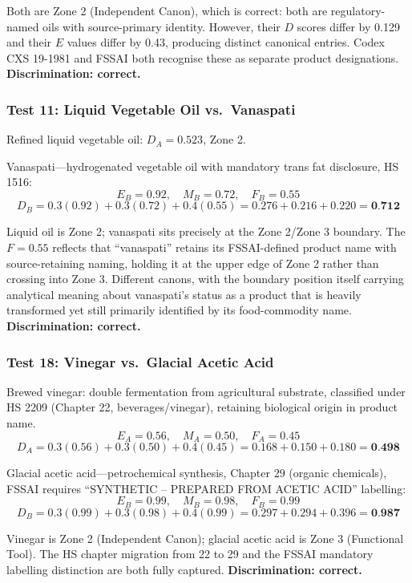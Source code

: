 \documentclass[12pt,a3paper]{article}
\begin{document}
Both are Zone 2 (Independent Canon), which is correct: both are regulatory-named oils with source-primary identity. However, their $D$ scores differ by 0.129 and their $E$ values differ by 0.43, producing distinct canonical entries. Codex CXS 19-1981 and FSSAI both recognise these as separate product designations. \textbf{Discrimination: correct.}

\subsubsection{Test 11: Liquid Vegetable Oil vs.\ Vanaspati}

Refined liquid vegetable oil: $D_A = 0.523$, Zone 2.

Vanaspati---hydrogenated vegetable oil with mandatory trans fat disclosure, HS 1516:
$$E_B = 0.92,\quad M_B = 0.72,\quad F_B = 0.55$$
$$D_B = 0.3(0.92) + 0.3(0.72) + 0.4(0.55) = 0.276 + 0.216 + 0.220 = \textbf{0.712}$$

Liquid oil is Zone 2; vanaspati sits precisely at the Zone 2/Zone 3 boundary. The $F = 0.55$ reflects that ``vanaspati'' retains its FSSAI-defined product name with source-retaining naming, holding it at the upper edge of Zone 2 rather than crossing into Zone 3. Different canons, with the boundary position itself carrying analytical meaning about vanaspati's status as a product that is heavily transformed yet still primarily identified by its food-commodity name. \textbf{Discrimination: correct.}

\subsubsection{Test 18: Vinegar vs.\ Glacial Acetic Acid}

Brewed vinegar: double fermentation from agricultural substrate, classified under HS 2209 (Chapter 22, beverages/vinegar), retaining biological origin in product name.
$$E_A = 0.56,\quad M_A = 0.50,\quad F_A = 0.45$$
$$D_A = 0.3(0.56) + 0.3(0.50) + 0.4(0.45) = 0.168 + 0.150 + 0.180 = \textbf{0.498}$$

Glacial acetic acid---petrochemical synthesis, Chapter 29 (organic chemicals), FSSAI requires ``SYNTHETIC -- PREPARED FROM ACETIC ACID'' labelling:
$$E_B = 0.99,\quad M_B = 0.98,\quad F_B = 0.99$$
$$D_B = 0.3(0.99) + 0.3(0.98) + 0.4(0.99) = 0.297 + 0.294 + 0.396 = \textbf{0.987}$$

Vinegar is Zone 2 (Independent Canon); glacial acetic acid is Zone 3 (Functional Tool). The HS chapter migration from 22 to 29 and the FSSAI mandatory labelling distinction are both fully captured. \textbf{Discrimination: correct.}
\end{document}

